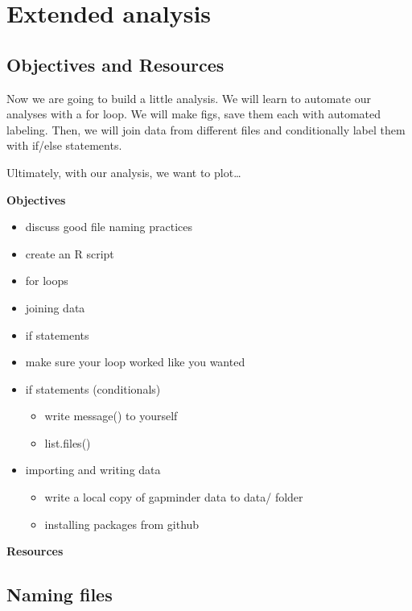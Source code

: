 \documentclass[]{book}
\providecommand{\tightlist}{%
  \setlength{\itemsep}{0pt}\setlength{\parskip}{0pt}}
\theoremstyle{definition}
\theoremstyle{definition}
\theoremstyle{definition}
\theoremstyle{remark}
\begin{document}
\hypertarget{programming}{\chapter{Extended
analysis}\label{programming}}

\section{Objectives and Resources}\label{objectives-and-resources}

Now we are going to build a little analysis. We will learn to automate
our analyses with a for loop. We will make figs, save them each with
automated labeling. Then, we will join data from different files and
conditionally label them with if/else statements.

Ultimately, with our analysis, we want to plot\ldots{}

\textbf{Objectives}

\begin{itemize}
\item
  discuss good file naming practices
\item
  create an R script
\item
  for loops
\item
  joining data
\item
  if statements
\item
  make sure your loop worked like you wanted
\item
  if statements (conditionals)

  \begin{itemize}
  \tightlist
  \item
    write message() to yourself
  \item
    list.files()
  \end{itemize}
\item
  importing and writing data

  \begin{itemize}
  \tightlist
  \item
    write a local copy of gapminder data to data/ folder
  \item
    installing packages from github
  \end{itemize}
\end{itemize}

\textbf{Resources}

\section{Naming files}\label{naming-files}
\end{document}
